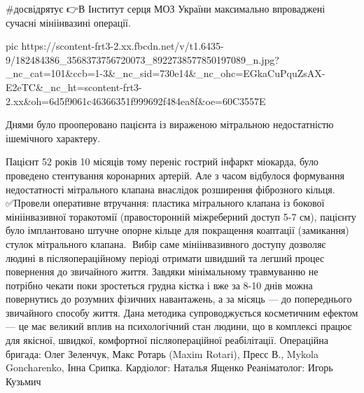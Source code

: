  
 
 
 
 

#досвідрятує
👉В Інститут серця МОЗ України максимально впроваджені сучасні мініінвазині операції. 


\ifcmt
  pic https://scontent-frt3-2.xx.fbcdn.net/v/t1.6435-9/182484386_3568373756720073_8922738577850197089_n.jpg?_nc_cat=101&ccb=1-3&_nc_sid=730e14&_nc_ohc=EGkaCuPquZsAX-E2eTC&_nc_ht=scontent-frt3-2.xx&oh=6d5f9061c46366351f999692f484ea8f&oe=60C3557E
\fi


Днями було прооперовано  пацієнта із вираженою мітральною  недостатністю ішемічного характеру.

Пацієнт 52 років 10 місяців тому переніс гострий інфаркт міокарда, було проведено стентування коронарних артерій. Але з часом відбулося формування недостатності мітрального клапана внаслідок розширення фіброзного кільця. 
✅Провели оперативне втручання: пластика мітрального клапана із бокової мініінвазивної торакотомії (правосторонній міжреберний доступ 5-7 см), пацієнту було імплантовано штучне опорне кільце для покращення коаптації (замикання) стулок мітрального клапана.
🔹Вибір саме мініінвазивного доступу дозволяє людині в післяопераційному періоді отримати швидший та легший процес повернення до звичайного життя.  
Завдяки мінімальному травмуванню не потрібно чекати поки зростеться грудна кістка і вже за 8-10 днів можна повернутись до розумних фізичних навантажень, а за місяць — до попереднього звичайного способу життя. 
Дана методика супроводжується косметичним ефектом — це має великий вплив на психологічний  стан людини, що в комплексі працює для якісної, швидкої, комфортної післяопераційної реабілітації.
Операційна бригада:
Олег Зеленчук, Макс Ротарь (Maxim Rotari), Пресс В., Mykola Goncharenko, Інна Срипка.
Кардіолог: Наталья Ященко
Реаніматолог: Игорь Кузьмич

